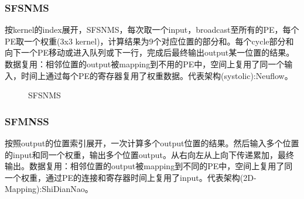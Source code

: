 \documentclass[UTF8]{scrartcl}
\begin{document}
		  
		  \subsubsection{SFSNMS}
		  按kernel的index展开，SFSNMS，每次取一个input，broadcast至所有的PE，每个PE取一个权重(3x3 kernel)，计算结果为9个对应位置的部分和。每个cycle部分和向下一个PE移动或进入队列或下一行，完成后最终输出output某一位置的结果。数据复用：相邻位置的output被mapping到不用的PE中，空间上复用了同一个输入，时间上通过每个PE的寄存器复用了权重数据。代表架构(systolic):Neuflow\cite{neoflow}。
		  
		  		  \begin{figure}[h]
		  		  	\centering
		  		  	\caption{SFSNMS}
		  		  	\label{fig3}
		  		  \end{figure}
		  
		  \subsubsection{SFMNSS}
		  按照output的位置索引展开，一次计算多个output位置的结果。然后输入多个位置的input和同一个权重，输出多个位置output。从右向左从上向下传递累加，最终输出。数据复用：相邻位置的output被mapping到不同的PE中，空间上复用了同一个权重，通过PE的连接和寄存器时间上复用了input。代表架构(2D-Mapping):ShiDianNao\cite{shidiannao}。
		  
\end{document}
